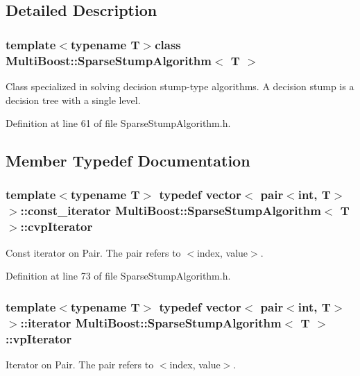\subsection{Detailed Description}
\subsubsection*{template$<$typename T$>$class Multi\-Boost\-::\-Sparse\-Stump\-Algorithm$<$ T $>$}

Class specialized in solving decision stump-\/type algorithms. A decision stump is a decision tree with a single level. 

Definition at line 61 of file Sparse\-Stump\-Algorithm.\-h.



\subsection{Member Typedef Documentation}
\hypertarget{classMultiBoost_1_1SparseStumpAlgorithm_a268cf150b7c667fc60f79dbc55790532}{
\subsubsection[{cvp\-Iterator}]{\setlength{\rightskip}{0pt plus 5cm}template$<$typename T$>$ typedef vector$<$ pair$<$int, T$>$ $>$\-::const\-\_\-iterator {\bf Multi\-Boost\-::\-Sparse\-Stump\-Algorithm}$<$ T $>$\-::{\bf cvp\-Iterator}}}\label{classMultiBoost_1_1SparseStumpAlgorithm_a268cf150b7c667fc60f79dbc55790532}
Const iterator on Pair. The pair refers to $<$index, value$>$. 

Definition at line 73 of file Sparse\-Stump\-Algorithm.\-h.

\hypertarget{classMultiBoost_1_1SparseStumpAlgorithm_ac4d346756184d29c08539b2dde0c1d31}{
\subsubsection[{vp\-Iterator}]{\setlength{\rightskip}{0pt plus 5cm}template$<$typename T$>$ typedef vector$<$ pair$<$int, T$>$ $>$\-::iterator {\bf Multi\-Boost\-::\-Sparse\-Stump\-Algorithm}$<$ T $>$\-::{\bf vp\-Iterator}}}\label{classMultiBoost_1_1SparseStumpAlgorithm_ac4d346756184d29c08539b2dde0c1d31}
Iterator on Pair. The pair refers to $<$index, value$>$. 

